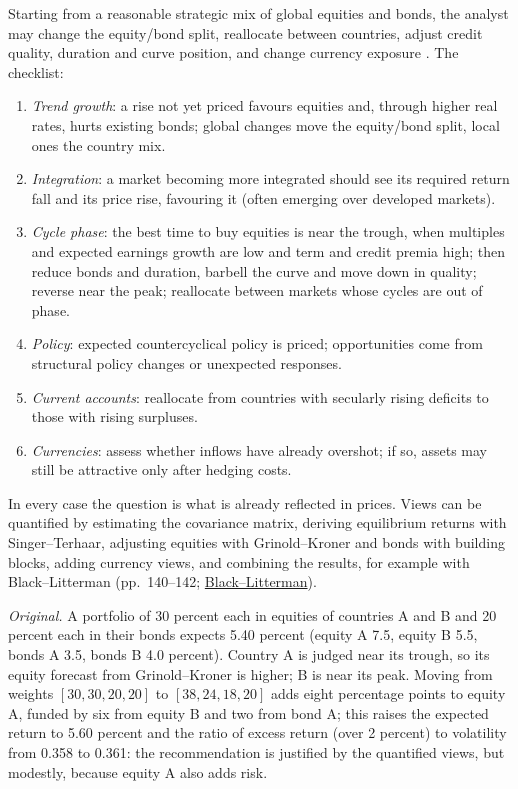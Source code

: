 \begin{qfexample}\label{ex:global-portfolio-macro-rebalancing}
 Starting from a reasonable strategic mix of global equities and bonds, the analyst may change the equity/bond split, reallocate between countries, adjust credit quality, duration and curve position, and change currency exposure \citep[chap.~4, sec.~8, pp.~138--142]{portfolio-management-in-practice-v1-2020}. The checklist:
\begin{enumerate}
\item \emph{Trend growth}: a rise not yet priced favours equities and, through higher real rates, hurts existing bonds; global changes move the equity/bond split, local ones the country mix.
\item \emph{Integration}: a market becoming more integrated should see its required return fall and its price rise, favouring it (often emerging over developed markets).
\item \emph{Cycle phase}: the best time to buy equities is near the trough, when multiples and expected earnings growth are low and term and credit premia high; then reduce bonds and duration, barbell the curve and move down in quality; reverse near the peak; reallocate between markets whose cycles are out of phase.
\item \emph{Policy}: expected countercyclical policy is priced; opportunities come from structural policy changes or unexpected responses.
\item \emph{Current accounts}: reallocate from countries with secularly rising deficits to those with rising surpluses.
\item \emph{Currencies}: assess whether inflows have already overshot; if so, assets may still be attractive only after hedging costs.
\end{enumerate}
In every case the question is what is already reflected in prices. Views can be quantified by estimating the covariance matrix, deriving equilibrium returns with Singer--Terhaar, adjusting equities with Grinold--Kroner and bonds with building blocks, adding currency views, and combining the results, for example with Black--Litterman (pp.~140--142; \hyperref[mod:black-litterman]{Black--Litterman}).

 \emph{Original.} A portfolio of 30 percent each in equities of countries A and B and 20 percent each in their bonds expects 5.40 percent (equity A 7.5, equity B 5.5, bonds A 3.5, bonds B 4.0 percent). Country A is judged near its trough, so its equity forecast from Grinold--Kroner is higher; B is near its peak. Moving from weights $[30,30,20,20]$ to $[38,24,18,20]$ adds eight percentage points to equity A, funded by six from equity B and two from bond A; this raises the expected return to 5.60 percent and the ratio of excess return (over 2 percent) to volatility from 0.358 to 0.361: the recommendation is justified by the quantified views, but modestly, because equity A also adds risk.


\end{qfexample}
